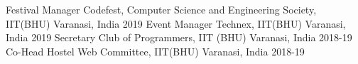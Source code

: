 \begin{cvhonors}
  \cvhonor
    {Festival Manager}
    {Codefest, Computer Science and Engineering Society, IIT(BHU)}
    {Varanasi, India}
    {2019}
  \cvhonor
    {Event Manager}
    {Technex, IIT(BHU)}
    {Varanasi, India}
    {2019}
  \cvhonor
    {Secretary}
    {Club of Programmers, IIT (BHU)}
    {Varanasi, India}
    {2018-19}
  \cvhonor
    {Co-Head}
    {Hostel Web Committee, IIT(BHU)}
    {Varanasi, India}
    {2018-19}
\end{cvhonors}
